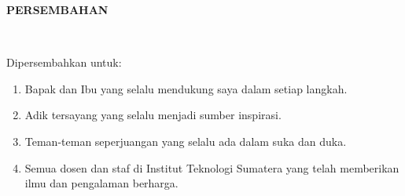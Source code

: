 \clearpage


\normalsize \bfseries \centering \MakeUppercase{Persembahan}
{}
\\[2\baselineskip]

\justifying \normalfont

Dipersembahkan untuk:
\begin{enumerate}
  \item Bapak dan Ibu yang selalu mendukung saya dalam setiap langkah.
  \item Adik tersayang yang selalu menjadi sumber inspirasi.
  \item Teman-teman seperjuangan yang selalu ada dalam suka dan duka.
  \item Semua dosen dan staf di Institut Teknologi Sumatera yang telah memberikan ilmu dan pengalaman berharga.
\end{enumerate}

\blindtext

\clearpage
